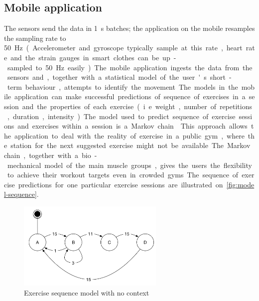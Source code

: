 \documentclass[a4paper, 10 pt, conference]{IEEEtran}
\begin{document}
\subsection{Mobile application}

The sensors send the data in \SI{1}{\second} batches; the application on the mobile resamples the sampling rate to \SI{50}\hertz. (Accelerometer and gyroscope typically sample at this rate, heart rate and the strain gauges in smart clothes can be up-sampled to \SI{50}{\hertz} easily.) The mobile application ingests the data from the sensors and, together with a statistical model of the user's short-term behaviour, attempts to identify the movement. The models in the mobile application can make successful predictions of sequence of exercises in a session and the properties of each exercise (i.e. weight, number of repetitions, duration, intensity). The model used to predict sequence of exercise sessions and exercises within a session is a Markov chain \cite{markov-chain-exercise}. This approach allows the application to deal with the reality of exercise in a public gym, where the station for the next suggested exercise might not be available. The Markov chain, together with a bio-mechanical model of the main muscle groups, gives the users the flexibility to achieve their workout targets even in crowded gyms. The sequence of exercise predictions for one particular exercise sessions are illustrated on \autoref{fig:model-sequence}.

\begin{figure}[h]
    \begin{center}
        \caption{Exercise sequence model with no context}
        \label{fig:model-sequence}
        \includegraphics[width=7cm,keepaspectratio]{ri-model-sequence.png}
    \end{center}
\end{figure}
\end{document}
